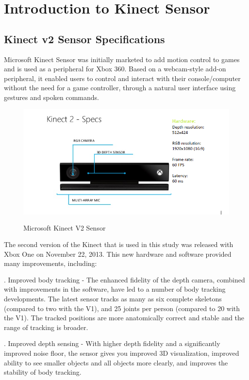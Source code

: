 \chapter{Introduction to Kinect Sensor} \label{Introduction to Kinect Sensor}

\section{Kinect v2 Sensor Specifications} \label{Kinect v2 Sensor Specifications}
\noindent Microsoft Kinect Sensor was initially marketed to add motion control to games and is used as a peripheral for Xbox 360. Based on a webcam-style add-on peripheral, it enabled users to control and interact with their console/computer without the need for a game controller, through a natural user interface using gestures and spoken commands.

\begin{figure}[H]
\centering
{\includegraphics[scale=0.8]{figkinect.png}}
\caption{Microsoft Kinect V2 Sensor}
\end{figure}
\newpage
\noindent The second version of the Kinect that is used in this study was released with Xbox One on November 22, 2013. This new hardware and software provided many improvements, including:

. Improved body tracking - The enhanced fidelity of the depth camera, combined with improvements in the software, have led to a number of body tracking developments. The latest sensor tracks as many as six complete skeletons (compared to two with the V1), and 25 joints per person (compared to 20 with the V1). The tracked positions are more anatomically correct and stable and the range of tracking is broader.

. Improved depth sensing - With higher depth fidelity and a significantly improved noise floor, the sensor gives you improved 3D visualization, improved ability to see smaller objects and all objects more clearly, and improves the stability of body tracking.

